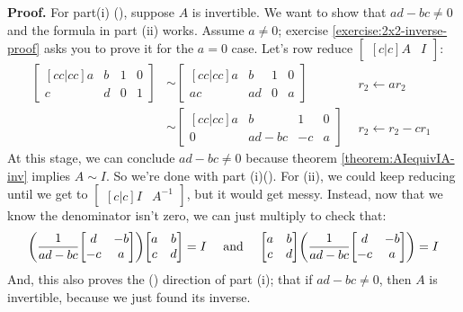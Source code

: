 \documentclass[11pt, letterpaper]{report}
\newenvironment{book}{}{}
\let\originalleft\left
\let\originalright\right
\renewcommand{\left}{\mathopen{}\mathclose\bgroup\originalleft}
\renewcommand{\right}{\aftergroup\egroup\originalright}
\newcounter{exercise}[section]
\newcounter{theorem}[chapter]
\begin{document}
\begin{book}
\textbf{Proof.} For part(i) (\rightarrow), suppose $A$ is invertible. We want to show that $ad-bc \ne 0$ and the formula in part (ii) works. Assume $a\ne0$; exercise \ref{exercise:2x2-inverse-proof} asks you to prove it for the $a=0$ case. Let's row reduce $\begin{bmatrix}[c|c]
A & I
\end{bmatrix}$:
\begin{align*}
\begin{bmatrix}[cc|cc]
a & b & 1 & 0 \\
c & d & 0 & 1
\end{bmatrix} &\sim \begin{bmatrix}[cc|cc]
a & b & 1 & 0 \\
ac & ad & 0 & a
\end{bmatrix} &\begin{matrix}
\hspace{2pt} \\
r_2\leftarrow ar_2
\end{matrix} \\
 &\sim \begin{bmatrix}[cc|cc]
a & b & 1 & 0 \\
0 & ad-bc & -c & a
\end{bmatrix} &\begin{matrix}
\hspace{2pt} \\
r_2\leftarrow r_2 -cr_{1}
\end{matrix}
\end{align*}
At this stage, we can conclude $ad-bc\ne0$ because theorem \ref{theorem:AIequivIA-inv} implies $A\sim I$. So we're done with part (i)(\rightarrow). For (ii), we could keep reducing until we get to $\begin{bmatrix}[c|c]
I & A^{-1}
\end{bmatrix}$, but it would get messy. Instead, now that we know the denominator isn't zero, we can just multiply to check that:  
\begin{equation}\label{eq:AA-inv}
\left(\frac{1}{ad-bc}\begin{bmatrix}
d & -b \\
-c & a
\end{bmatrix}\right)\begin{bmatrix}
a & b \\
c & d
\end{bmatrix} = I \quad \text{ and } \quad \begin{bmatrix}
a & b \\
c & d
\end{bmatrix}\left(\frac{1}{ad-bc}\begin{bmatrix}
d & -b \\
-c & a
\end{bmatrix}\right) = I
\end{equation}
And, this also proves the (\leftarrow) direction of part (i); that if $ad-bc\ne0$, then $A$ is invertible, because we just found its inverse. \blacksquare
\end{book}
\end{document}
